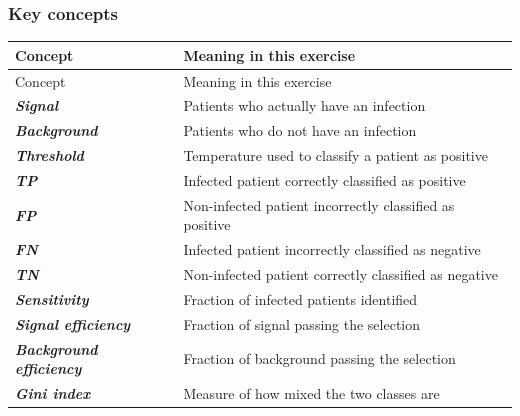 \documentclass[10pt]{article}
\begin{document}
\subsubsection*{Key concepts}
\begingroup
\small
\setlength{\tabcolsep}{4pt}
\begin{longtable}{l|l}
Concept & Meaning in this exercise \\[1.5pt]
\hline
\endfirsthead
Concept & Meaning in this exercise \\[1.5pt]
\hline
\endhead
\textbf{\textit{Signal}} & Patients who actually have an infection \\[1.5pt]
\textbf{\textit{Background}} & Patients who do not have an infection \\[1.5pt]
\textbf{\textit{Threshold}} & Temperature used to classify a patient as positive \\[1.5pt]
\textbf{\textit{TP}} & Infected patient correctly classified as positive \\[1.5pt]
\textbf{\textit{FP}} & Non-infected patient incorrectly classified as positive \\[1.5pt]
\textbf{\textit{FN}} & Infected patient incorrectly classified as negative \\[1.5pt]
\textbf{\textit{TN}} & Non-infected patient correctly classified as negative \\[1.5pt]
\textbf{\textit{Sensitivity}} & Fraction of infected patients identified \\[1.5pt]
\textbf{\textit{Signal efficiency}} & Fraction of signal passing the selection \\[1.5pt]
\textbf{\textit{Background efficiency}} & Fraction of background passing the selection \\[1.5pt]
\textbf{\textit{Gini index}} & Measure of how mixed the two classes are \\[1.5pt]
\end{longtable}
\endgroup
\end{document}
